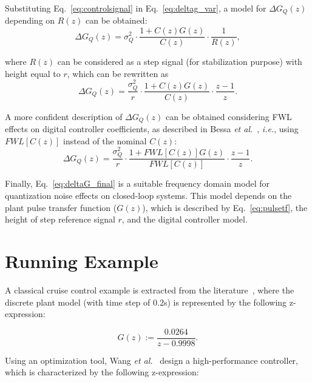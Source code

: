\documentclass{sig-alternate-05-2015}
\begin{document}
Substituting Eq.~\eqref{eq:controlsignal} in Eq.~\eqref{eq:deltag_var}, a
model for $\Delta{G_{Q}(z)}$ depending on $R(z)$ can be obtained:
%
\begin{equation}
\Delta{G_{Q}(z)}=\sigma^{2}_{Q}\cdot \frac{1+C(z)G(z)}{C(z)} \cdot \frac{1}{R(z)},
\end{equation}

\noindent where $R(z)$ can be considered as a step signal (for stabilization
purpose) with height equal to $r$, which can be rewritten as
%
\begin{equation}
\Delta{G_{Q}(z)}=\frac{\sigma^{2}_{Q}}{r}\cdot \frac{1+C(z)G(z)}{C(z)} \cdot \frac{z-1}{z}.
\end{equation}

A more confident description of $\Delta{G_{Q}(z)}$ can be obtained
considering FWL effects on digital controller coefficients, as described in
Bessa {\it et al.}~\cite{Bessa16}, {\it i.e.}, using $FWL[C(z)]$ instead of
the nominal $C(z)$:
%
\begin{equation}
\label{eq:deltaG_final}
\Delta{G_{Q}(z)}=\frac{\sigma^{2}_{Q}}{r}\cdot \frac{1+FWL[C(z)]G(z)}{FWL[C(z)]} \cdot \frac{z-1}{z}.
\end{equation}

Finally, Eq.~\eqref{eq:deltaG_final} is a suitable frequency domain model
for quantization noise effects on closed-loop systems.  This model depends
on the plant pulse transfer function ($G(z)$), which is described by
Eq.~\eqref{eq:pulsetf}, the height of step reference signal $r$, and the
digital controller model.


\section{Running Example} \label{sec:running-ex}

A classical cruise control example is extracted from the
literature~\cite{Astrom08}, where the discrete plant model (with time step
of $0.2$s) is represented by the following z-expression:

\begin{equation}
\label{Eq:running-example-plant}
G\left(z\right) := \frac{0.0264}{z-0.9998}.
\end{equation}

Using an optimization tool, Wang {\it et
al.}~\cite{DBLP:conf/hybrid/WangGRJF16} design a high-performance
controller, which is characterized by the following z-expression:
\end{document}
